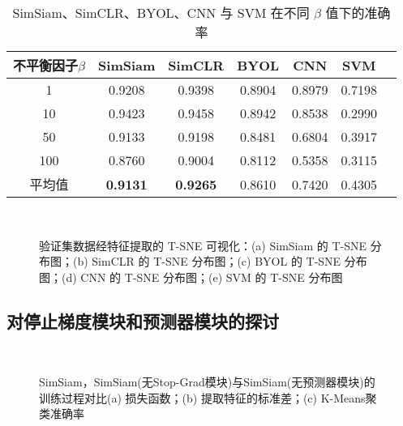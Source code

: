 \documentclass[master]{thesis-uestc}
\begin{document}
\begin{table}[!h]
    \caption{SimSiam、SimCLR、BYOL、CNN 与 SVM 在不同 $\beta$ 值下的准确率}
    \centering
    \begin{tabular}{ccccccc}
    \toprule
    不平衡因子$\beta$  & SimSiam & SimCLR & BYOL & CNN & SVM \\
    \midrule
    1   & 0.9208  & 0.9398 & 0.8904 & 0.8979 & 0.7198 \\
    10  & 0.9423  & 0.9458 & 0.8942 & 0.8538 & 0.2990 \\
    50  & 0.9133  & 0.9198 & 0.8481 & 0.6804 & 0.3917 \\
    100 & 0.8760  & 0.9004 & 0.8112 & 0.5358 & 0.3115 \\
    \midrule
    平均值 & \textbf{0.9131} & \textbf{0.9265} & 0.8610 & 0.7420 & 0.4305 \\
    \bottomrule
    \end{tabular}
    \label{simsiam_simclr_byol_cnn_svm_results}
\end{table}


\begin{figure}
    \centering
    \\
    \caption{验证集数据经特征提取的 T-SNE 可视化：(a) SimSiam 的 T-SNE 分布图；(b) SimCLR 的 T-SNE 分布图；(c) BYOL 的 T-SNE 分布图；(d) CNN 的 T-SNE 分布图；(e) SVM 的 T-SNE 分布图}
    \label{tsne_of_all_models}
\end{figure}

\subsection{对停止梯度模块和预测器模块的探讨}
\label{sec:discuss_of_simsiam_module}

\begin{figure}
    \centering
    \\
    \caption{SimSiam，SimSiam(无Stop-Grad模块)与SimSiam(无预测器模块)的训练过程对比(a) 损失函数；(b) 提取特征的标准差；(c) K-Means聚类准确率}
    \label{train_process_simsiam_discuss}
\end{figure}
\end{document}
